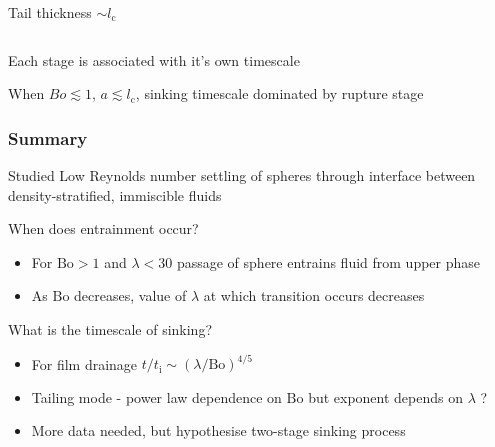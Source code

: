 \documentclass{beamer}
\begin{document}
\begin{frame}
\begin{columns}[t]
\begin{column}{0.5\paperwidth}
      \vspace{-0.5cm}

      Tail thickness $\sim l_{\text{c}}$

    \end{column}

  \end{columns}

  \vspace{0.5cm}

  Each stage is associated with it's own timescale

  When $Bo \lesssim 1$, $a \lesssim l_{\text{c}}$, sinking timescale dominated by rupture stage
\end{frame}

\begin{frame}
  \frametitle{Summary}

  Studied Low Reynolds number settling of spheres through interface between density-stratified, immiscible fluids \\

  \vspace{0.75cm}

  When does entrainment occur?
  \begin{itemize}
  \item For $\text{Bo} > 1$ and $\lambda < 30$ passage of sphere entrains fluid from upper phase \\
  \item As $\text{Bo}$ decreases, value of $\lambda$ at which transition occurs decreases \\
  \end{itemize}

  \vspace{0.75cm}

  What is the timescale of sinking?
  \begin{itemize}
  \item For film drainage $t / t_{\text{i}} \sim (\lambda / \text{Bo})^{4/5}$ \\
  \item Tailing mode - power law dependence on $\text{Bo}$ but exponent depends on $\lambda$ ? \\
  \item More data needed, but hypothesise two-stage sinking process \\
  \end{itemize}

\end{frame}
\end{document}
